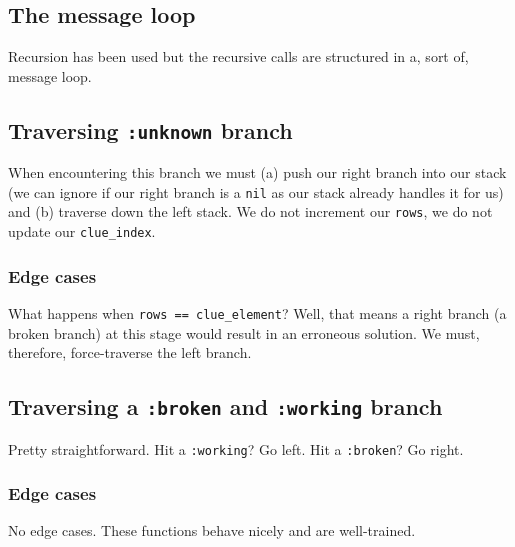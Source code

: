 \pagebreak
\subsection{The message loop}
Recursion has been used but the recursive calls are structured in a, sort of, message loop.

\subsection{Traversing \texttt{:unknown} branch}
When encountering this branch we must (a) push our right branch into our stack (we can ignore if our right branch is a \texttt{nil} as our stack already handles it for us)
and (b) traverse down the left stack. We do not increment our \texttt{rows}, we do not update our \texttt{clue\_index}.



\subsubsection{Edge cases}
What happens when \texttt{rows == clue\_element}? Well, that means a right branch (a broken branch) at this stage would result in an erroneous solution. We must, therefore, force-traverse the left branch.



\subsection{Traversing a \texttt{:broken} and \texttt{:working} branch}
Pretty straightforward. Hit a \texttt{:working}? Go left. Hit a \texttt{:broken}? Go right.

\subsubsection{Edge cases}
No edge cases. These functions behave nicely and are well-trained.



